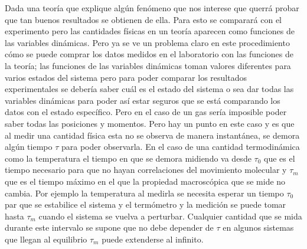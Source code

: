 Dada una teoría que explique algún fenómeno que nos interese que querrá probar que tan buenos resultados se obtienen de ella. Para esto se comparará con el experimento pero las cantidades físicas en un teoría aparecen como funciones de las variables dinámicas. Pero ya se ve un problema claro en este procedimiento cómo se puede comprar los datos medidos en el laboratorio con las funciones de la teoría; las funciones de las variables dinámicas toman valores diferentes para varios estados del sistema pero para poder comparar los resultados experimentales se debería saber cuál es el estado del sistema o sea dar todas las variables dinámicas para poder así estar seguros que se está comparando los datos con el estado específico. Pero en el caso de un gas sería imposible poder saber todas las posiciones y momentos. Pero hay un punto en este caso y es que al medir una cantidad física esta no se observa de manera instantánea, se demora algún tiempo $\tau$ para poder observarla. En el caso de una cantidad termodinámica como la temperatura el tiempo en que se demora midiendo va desde $\tau_{0}$ que es el tiempo necesario para que no hayan correlaciones del movimiento molecular y  $\tau_{m}$ que es el tiempo máximo en el que la propiedad macroscópica que se mide no cambia. Por ejemplo la temperatura al medirla se necesita esperar un tiempo $\tau_{0}$ par que se estabilice el sistema y el termómetro y la medición se puede tomar hasta $\tau_{m}$ cuando el sistema se vuelva a perturbar. Cualquier cantidad que se mida durante este intervalo se supone que no debe depender de $\tau$ en algunos sistemas que llegan al equilibrio $\tau_{m}$ puede extenderse al infinito.


